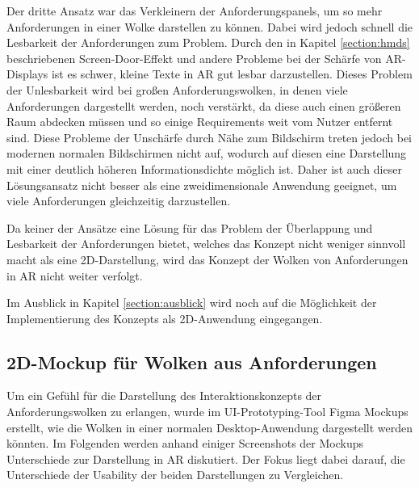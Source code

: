 Der dritte Ansatz war das Verkleinern der Anforderungspanels, um so mehr Anforderungen in einer Wolke darstellen zu können.
Dabei wird jedoch schnell die Lesbarkeit der Anforderungen zum Problem.
Durch den in Kapitel \ref{section:hmds} beschriebenen Screen-Door-Effekt und andere Probleme bei der Schärfe von AR-Displays ist es schwer, kleine Texte in AR gut lesbar darzustellen.
Dieses Problem der Unlesbarkeit wird bei großen Anforderungswolken, in denen viele Anforderungen dargestellt werden, noch verstärkt, da diese auch einen größeren Raum abdecken müssen und so einige Requirements weit vom Nutzer entfernt sind.
Diese Probleme der Unschärfe durch Nähe zum Bildschirm treten jedoch bei modernen normalen Bildschirmen nicht auf, wodurch auf diesen eine Darstellung mit einer deutlich höheren Informationsdichte möglich ist.
Daher ist auch dieser Lösungsansatz nicht besser als eine zweidimensionale Anwendung geeignet, um viele Anforderungen gleichzeitig darzustellen.

Da keiner der Ansätze eine Lösung für das Problem der Überlappung und Lesbarkeit der Anforderungen bietet, welches das Konzept nicht weniger sinnvoll macht als eine 2D-Darstellung, wird das Konzept der Wolken von Anforderungen in AR nicht weiter verfolgt.

Im Ausblick in Kapitel \ref{section:ausblick} wird noch auf die Möglichkeit der Implementierung des Konzepts als 2D-Anwendung eingegangen.

\subsection{2D-Mockup für Wolken aus Anforderungen}

Um ein Gefühl für die Darstellung des Interaktionskonzepts der Anforderungswolken zu erlangen, wurde im UI-Prototyping-Tool Figma Mockups erstellt, wie die Wolken in einer normalen Desktop-Anwendung dargestellt werden könnten.
Im Folgenden werden anhand einiger Screenshots der Mockups Unterschiede zur Darstellung in AR diskutiert.
Der Fokus liegt dabei darauf, die Unterschiede der Usability der beiden Darstellungen zu Vergleichen.


